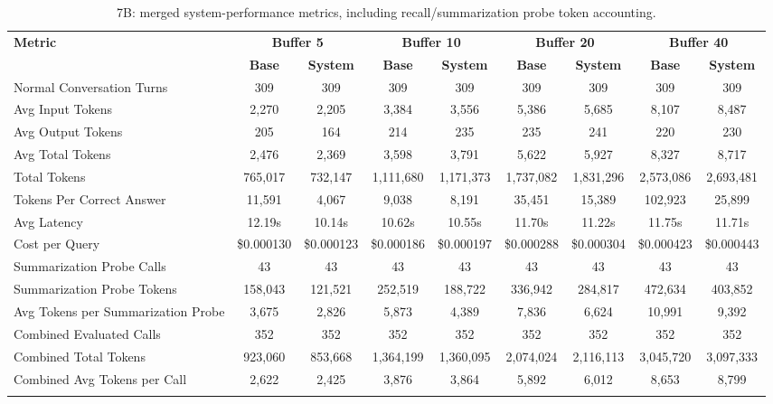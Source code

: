 \begin{table}[htbp]
\caption{7B: merged system-performance metrics, including recall/summarization probe token accounting.}\label{tab:7b_perf_main}
\centering
\tiny
\setlength{\tabcolsep}{2.2pt}
\begin{adjustbox}{width=\textwidth}
\begin{tabular}{lcccccccc}
\toprule
\textbf{Metric} & \multicolumn{2}{c}{\textbf{Buffer 5}} & \multicolumn{2}{c}{\textbf{Buffer 10}} & \multicolumn{2}{c}{\textbf{Buffer 20}} & \multicolumn{2}{c}{\textbf{Buffer 40}} \\
\cmidrule(lr){2-3}\cmidrule(lr){4-5}\cmidrule(lr){6-7}\cmidrule(lr){8-9}
 & \textbf{Base} & \textbf{System} & \textbf{Base} & \textbf{System} & \textbf{Base} & \textbf{System} & \textbf{Base} & \textbf{System} \\
\midrule
Normal Conversation Turns & 309 & 309 & 309 & 309 & 309 & 309 & 309 & 309 \\
Avg Input Tokens & 2,270 & 2,205 & 3,384 & 3,556 & 5,386 & 5,685 & 8,107 & 8,487 \\
Avg Output Tokens & 205 & 164 & 214 & 235 & 235 & 241 & 220 & 230 \\
Avg Total Tokens & 2,476 & 2,369 & 3,598 & 3,791 & 5,622 & 5,927 & 8,327 & 8,717 \\
Total Tokens & 765,017 & 732,147 & 1,111,680 & 1,171,373 & 1,737,082 & 1,831,296 & 2,573,086 & 2,693,481 \\
Tokens Per Correct Answer & 11,591 & 4,067 & 9,038 & 8,191 & 35,451 & 15,389 & 102,923 & 25,899 \\
Avg Latency & 12.19s & 10.14s & 10.62s & 10.55s & 11.70s & 11.22s & 11.75s & 11.71s \\
Cost per Query & \$0.000130 & \$0.000123 & \$0.000186 & \$0.000197 & \$0.000288 & \$0.000304 & \$0.000423 & \$0.000443 \\
Summarization Probe Calls & 43 & 43 & 43 & 43 & 43 & 43 & 43 & 43 \\
Summarization Probe Tokens & 158,043 & 121,521 & 252,519 & 188,722 & 336,942 & 284,817 & 472,634 & 403,852 \\
Avg Tokens per Summarization Probe & 3,675 & 2,826 & 5,873 & 4,389 & 7,836 & 6,624 & 10,991 & 9,392 \\
Combined Evaluated Calls & 352 & 352 & 352 & 352 & 352 & 352 & 352 & 352 \\
Combined Total Tokens & 923,060 & 853,668 & 1,364,199 & 1,360,095 & 2,074,024 & 2,116,113 & 3,045,720 & 3,097,333 \\
Combined Avg Tokens per Call & 2,622 & 2,425 & 3,876 & 3,864 & 5,892 & 6,012 & 8,653 & 8,799 \\
\botrule
\end{tabular}
\end{adjustbox}
\end{table}

